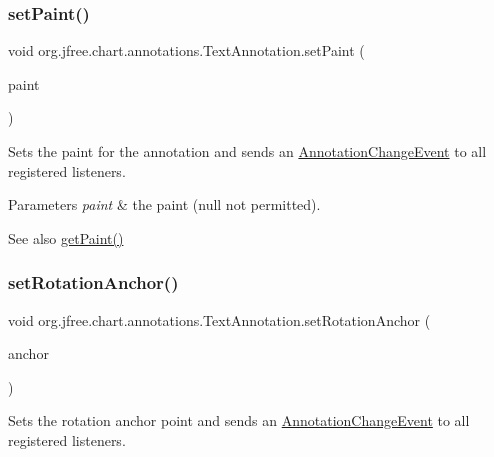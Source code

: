 \subsubsection{\texorpdfstring{set\+Paint()}{setPaint()}}
{\footnotesize\ttfamily void org.\+jfree.\+chart.\+annotations.\+Text\+Annotation.\+set\+Paint (\begin{DoxyParamCaption}\item[{Paint}]{paint }\end{DoxyParamCaption})}

Sets the paint for the annotation and sends an \mbox{\hyperlink{}{Annotation\+Change\+Event}} to all registered listeners.


\begin{DoxyParams}{Parameters}
{\em paint} & the paint ({\ttfamily null} not permitted).\\
\hline
\end{DoxyParams}
\begin{DoxySeeAlso}{See also}
\mbox{\hyperlink{classorg_1_1jfree_1_1chart_1_1annotations_1_1_text_annotation_a2ee970d0b9a52455ed0054b120055620}{get\+Paint()}} 
\end{DoxySeeAlso}
\mbox{\label{classorg_1_1jfree_1_1chart_1_1annotations_1_1_text_annotation_a1d43efc7fe9a628e089ded8bc447564b}} 
\subsubsection{\texorpdfstring{set\+Rotation\+Anchor()}{setRotationAnchor()}}
{\footnotesize\ttfamily void org.\+jfree.\+chart.\+annotations.\+Text\+Annotation.\+set\+Rotation\+Anchor (\begin{DoxyParamCaption}\item[{Text\+Anchor}]{anchor }\end{DoxyParamCaption})}

Sets the rotation anchor point and sends an \mbox{\hyperlink{}{Annotation\+Change\+Event}} to all registered listeners.


